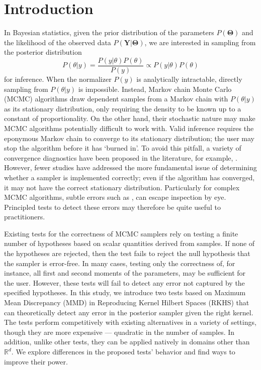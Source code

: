 \documentclass[a4paper,11pt]{article}
\begin{document}
\section{Introduction}
In Bayesian statistics, given the prior distribution of the parameters $P(\mathbf{\Theta})$ and the likelihood of the observed data $P(\mathbf{Y} | \mathbf{\Theta})$, we are interested in sampling from the posterior distribution
\begin{equation}
    P(\theta | y) = \frac{P(y | \theta)P(\theta)}{P(y)} \propto P(y | \theta)P(\theta)
    \label{eq:posterior}
\end{equation}
for inference. When the normalizer $P(y)$ is analytically intractable, directly sampling from $P(\theta | y)$ is impossible. Instead, Markov chain Monte Carlo (MCMC) algorithms draw dependent samples from a Markov chain with $P(\theta | y)$ as its stationary distribution, only requiring the density to be known up to a constant of proportionality. On the other hand, their stochastic nature may make MCMC algorithms potentially difficult to work with. Valid inference requires the eponymous Markov chain to converge to its stationary distribution; the user may stop the algorithm before it has `burned in'. To avoid this pitfall, a variety of convergence diagnostics have been proposed in the literature, for example, \cite{gelman_inference_1992,geweke_evaluating_1991}. However, fewer studies have addressed the more fundamental issue of determining whether a sampler is implemented correctly; even if the algorithm has converged, it may not have the correct stationary distribution. Particularly for complex MCMC algorithms, subtle errors such as \cite{del_negro_time_2015,karlsson_corrigendum_2017}, can escape inspection by eye. Principled tests to detect these errors may therefore be quite useful to practitioners.

Existing tests for the correctness of MCMC samplers rely on testing a finite number of hypotheses based on scalar quantities derived from samples. If none of the hypotheses are rejected, then the test fails to reject the null hypothesis that the sampler is error-free. In many cases, testing only the correctness of, for instance, all first and second moments of the parameters, may be sufficient for the user. However, these tests will fail to detect any error not captured by the specified hypotheses. In this study, we introduce two tests based on Maximum Mean Discrepancy (MMD) in Reproducing Kernel Hilbert Spaces (RKHS) that can theoretically detect any error in the posterior sampler given the right kernel. The tests perform competitively with existing alternatives in a variety of settings, though they are more expensive --- quadratic in the number of samples. In addition, unlike other tests, they can be applied natively in domains other than $\mathbb{R}^{d}$. We explore differences in the proposed tests' behavior and find ways to improve their power.
\end{document}
